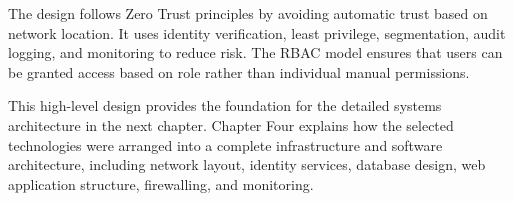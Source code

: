 The design follows Zero Trust principles by avoiding automatic trust based on network location. It uses identity verification, least privilege, segmentation, audit logging, and monitoring to reduce risk. The RBAC model ensures that users can be granted access based on role rather than individual manual permissions.

This high-level design provides the foundation for the detailed systems architecture in the next chapter. Chapter Four explains how the selected technologies were arranged into a complete infrastructure and software architecture, including network layout, identity services, database design, web application structure, firewalling, and monitoring.

